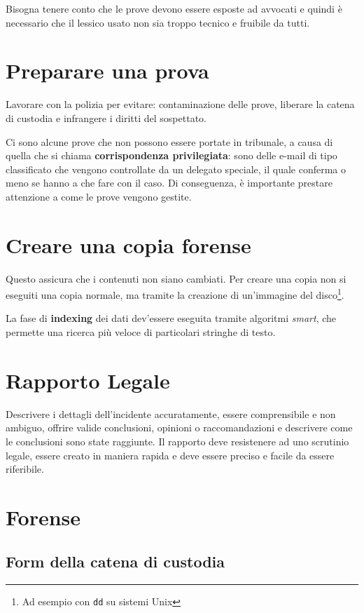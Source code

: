 Bisogna tenere conto che le prove devono essere esposte ad avvocati
e quindi è necessario che il lessico usato non sia troppo tecnico e fruibile da tutti.

\section{Preparare una prova}

Lavorare con la polizia per evitare: contaminazione delle prove, liberare la
catena di custodia e infrangere i diritti del sospettato.

Ci sono alcune prove che non possono essere portate in tribunale, a causa di
quella che si chiama \textbf{corrispondenza privilegiata}: sono delle e-mail
di tipo classificato che vengono controllate da un delegato speciale, il quale
conferma o meno se hanno a che fare con il caso. Di conseguenza, è importante
prestare attenzione a come le prove vengono gestite.

\section{Creare una copia forense}

Questo assicura che i contenuti non siano cambiati. Per creare una copia non si
 eseguiti una copia normale, ma tramite la creazione di
un'immagine del disco\footnote{Ad esempio con \texttt{dd} su sistemi Unix}.

La fase di \textbf{indexing} dei dati dev'essere eseguita tramite algoritmi
\textit{smart}, che permette una ricerca più veloce di particolari stringhe di
testo.

\section{Rapporto Legale}

Descrivere i dettagli dell'incidente accuratamente, essere comprensibile e non
ambiguo, offrire valide conclusioni, opinioni o raccomandazioni e descrivere come
le conclusioni sono state raggiunte. Il rapporto deve resistenere ad uno scrutinio
legale, essere creato in maniera rapida e deve essere preciso e facile da essere
riferibile.

\section{Forense}

\subsection{Form della catena di custodia}

